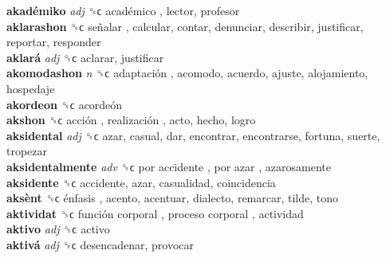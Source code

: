 \textbf{akadémiko} \emph{adj}  ␝ϲ   académico , lector, profesor  \\
\textbf{aklarashon} ␝ϲ   señalar , calcular, contar, denunciar, describir, justificar, reportar, responder  \\
\textbf{aklará} \emph{adj}  ␝ϲ  aclarar, justificar  \\
\textbf{akomodashon} \emph{n}  ␝ϲ   adaptación , acomodo, acuerdo, ajuste, alojamiento, hospedaje  \\
\textbf{akordeon} ␝ϲ   acordeón   \\
\textbf{akshon} ␝ϲ   acción ,  realización , acto, hecho, logro  \\
\textbf{aksidental} \emph{adj}  ␝ϲ  azar, casual, dar, encontrar, encontrarse, fortuna, suerte, tropezar  \\
\textbf{aksidentalmente} \emph{adv}  ␝ϲ   por accidente ,  por azar , azarosamente  \\
\textbf{aksidente} ␝ϲ  accidente, azar, casualidad, coincidencia  \\
\textbf{aksènt} ␝ϲ   énfasis , acento, acentuar, dialecto, remarcar, tilde, tono  \\
\textbf{aktividat} ␝ϲ   función corporal ,  proceso corporal , actividad  \\
\textbf{aktivo} \emph{adj}  ␝ϲ  activo  \\
\textbf{aktivá} \emph{adj}  ␝ϲ  desencadenar, provocar  \\
